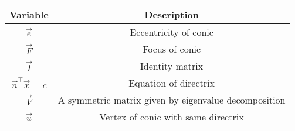 \begin{tabular}[12pt]{ |c| c|}
    \hline
    \textbf{Variable} & \textbf{Description}\\ 
    \hline
	$\vec{e}$ & Eccentricity of conic\\
	\hline
	$\vec{F}$ & Focus of conic\\
	\hline
	$\vec{I}$ & Identity matrix\\
	\hline
	$\vec{n}^{\top}\vec{x}=c$ & Equation of directrix\\
	\hline
	$\vec{V}$ & A symmetric matrix given by eigenvalue decomposition\\
	\hline
	$\vec{u}$ & Vertex of conic with same directrix\\
	\hline
\end{tabular}
